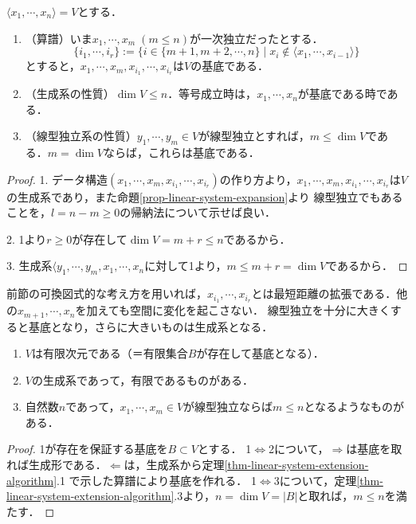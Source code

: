\documentclass[uplatex, 12pt, dvipdfmx]{jsreport}
\begin{document}
\begin{theorem}[線型独立系の基底への延長算譜]\label{thm-linear-system-extension-algorithm}
    $\langle x_1,\cdots,x_n\rangle =V$とする．
    \begin{enumerate}
        \item （算譜）いま$x_1,\cdots,x_m\;(m\le n)$が一次独立だったとする．
        \[\{i_1,\cdots,i_r\}:=\{i\in \{m+1,m+2,\cdots,n\}\mid x_i\notin\langle x_1,\cdots,x_{i-1}\rangle\}\]
        とすると，$x_1,\cdots,x_m,x_{i_1},\cdots,x_{i_r}$は$V$の基底である．
        \item （生成系の性質）$\dim V\le n$．等号成立時は，$x_1,\cdots,x_n$が基底である時である．
        \item （線型独立系の性質）$y_1,\cdots,y_m\in V$が線型独立とすれば，$m\le\dim V$である．$m=\dim V$ならば，これらは基底である．
    \end{enumerate}
\end{theorem}
\begin{proof}
    1. データ構造$(x_1,\cdots,x_m,x_{i_1},\cdots,x_{i_r})$の作り方より，$x_1,\cdots,x_m,x_{i_1},\cdots,x_{i_r}$は$V$の生成系であり，また命題\ref{prop-linear-system-expansion}より
    線型独立でもあることを，$l=n-m\ge 0$の帰納法について示せば良い．

    2. 1より$r\ge 0$が存在して$\dim V=m+r\le n$であるから．

    3. 生成系$\langle y_1,\cdots,y_m,x_1,\cdots,x_n$に対して1より，$m\le m+r=\dim V$であるから．
\end{proof}
\begin{remark}
    前節の可換図式的な考え方を用いれば，$x_{i_1},\cdots,x_{i_r}$とは最短距離の拡張である．他の$x_{m+1},\cdots,x_n$を加えても空間に変化を起こさない．
    線型独立を十分に大きくすると基底となり，さらに大きいものは生成系となる．
\end{remark}

\begin{corollary}[有限次元であることの特徴付け]\mbox{}
    \begin{enumerate}
        \item $V$は有限次元である（＝有限集合$B$が存在して基底となる）．
        \item $V$の生成系であって，有限であるものがある．
        \item 自然数$n$であって，$x_1,\cdots,x_m\in V$が線型独立ならば$m\le n$となるようなものがある．
    \end{enumerate}
\end{corollary}
\begin{proof}
    1が存在を保証する基底を$B\subset V$とする．
    1$\Leftrightarrow$2について，$\Rightarrow$は基底を取れば生成形である．$\Leftarrow$は，生成系から定理\ref{thm-linear-system-extension-algorithm}.1
    で示した算譜により基底を作れる．
    1$\Leftrightarrow$3について，定理\ref{thm-linear-system-extension-algorithm}.3より，$n=\dim V=|B|$と取れば，$m\le n$を満たす．
\end{proof}
\end{document}

